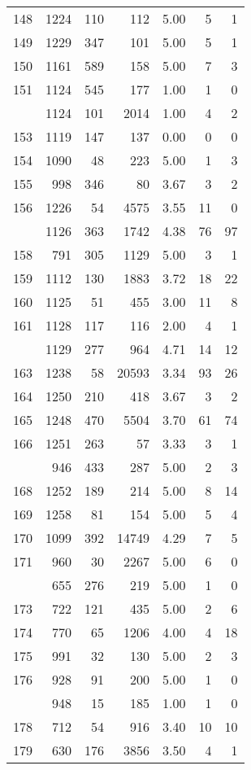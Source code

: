 \documentclass[
]{article}
\begin{document}
\begin{table}
\begin{tabular}[t]{lrrrrrr}
148 & 1224 & 110 & 112 & 5.00 & 5 & 1\\
149 & 1229 & 347 & 101 & 5.00 & 5 & 1\\
150 & 1161 & 589 & 158 & 5.00 & 7 & 3\\
151 & 1124 & 545 & 177 & 1.00 & 1 & 0\\
\addlinespace
152 & 1124 & 101 & 2014 & 1.00 & 4 & 2\\
153 & 1119 & 147 & 137 & 0.00 & 0 & 0\\
154 & 1090 & 48 & 223 & 5.00 & 1 & 3\\
155 & 998 & 346 & 80 & 3.67 & 3 & 2\\
156 & 1226 & 54 & 4575 & 3.55 & 11 & 0\\
\addlinespace
157 & 1126 & 363 & 1742 & 4.38 & 76 & 97\\
158 & 791 & 305 & 1129 & 5.00 & 3 & 1\\
159 & 1112 & 130 & 1883 & 3.72 & 18 & 22\\
160 & 1125 & 51 & 455 & 3.00 & 11 & 8\\
161 & 1128 & 117 & 116 & 2.00 & 4 & 1\\
\addlinespace
162 & 1129 & 277 & 964 & 4.71 & 14 & 12\\
163 & 1238 & 58 & 20593 & 3.34 & 93 & 26\\
164 & 1250 & 210 & 418 & 3.67 & 3 & 2\\
165 & 1248 & 470 & 5504 & 3.70 & 61 & 74\\
166 & 1251 & 263 & 57 & 3.33 & 3 & 1\\
\addlinespace
167 & 946 & 433 & 287 & 5.00 & 2 & 3\\
168 & 1252 & 189 & 214 & 5.00 & 8 & 14\\
169 & 1258 & 81 & 154 & 5.00 & 5 & 4\\
170 & 1099 & 392 & 14749 & 4.29 & 7 & 5\\
171 & 960 & 30 & 2267 & 5.00 & 6 & 0\\
\addlinespace
172 & 655 & 276 & 219 & 5.00 & 1 & 0\\
173 & 722 & 121 & 435 & 5.00 & 2 & 6\\
174 & 770 & 65 & 1206 & 4.00 & 4 & 18\\
175 & 991 & 32 & 130 & 5.00 & 2 & 3\\
176 & 928 & 91 & 200 & 5.00 & 1 & 0\\
\addlinespace
177 & 948 & 15 & 185 & 1.00 & 1 & 0\\
178 & 712 & 54 & 916 & 3.40 & 10 & 10\\
179 & 630 & 176 & 3856 & 3.50 & 4 & 1\\

\end{tabular}
\end{table}
\end{document}
